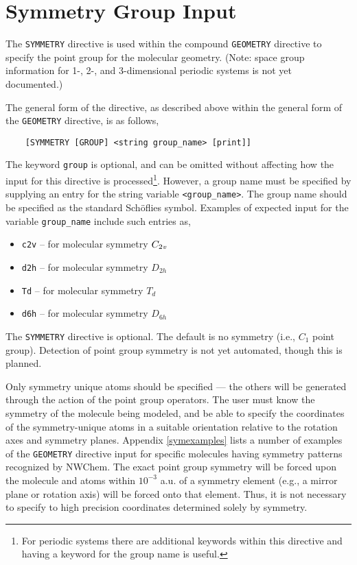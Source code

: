 \section{Symmetry Group Input}

The \verb+SYMMETRY+ directive is used within the compound \verb+GEOMETRY+
directive to specify the point group for the
molecular geometry. (Note: space group information for 1-, 2-, and
3-dimensional periodic systems is not yet documented.)

The general form of the directive, as described above within the general
form of the \verb+GEOMETRY+ directive, is as follows,
\begin{verbatim}
    [SYMMETRY [GROUP] <string group_name> [print]]
\end{verbatim}
The keyword \verb+group+ is optional, and can be omitted without affecting
how the input for this directive is processed\footnote{For periodic
  systems there are additional keywords within this directive and having
  a keyword for the group name is useful.}.
However, a group name must be specified by supplying an entry for the
string variable \verb+<group_name>+.  The
group name should be specified as the standard Sch\"{o}flies symbol.
Examples of expected input for the variable \verb+group_name+ include
such entries as,

\begin{itemize}
\item \verb+c2v+ -- for molecular symmetry $C_{2{\it v}}$
\item \verb+d2h+ -- for molecular symmetry $D_{2h}$
\item \verb+Td+ -- for molecular symmetry $T_d$
\item \verb+d6h+ -- for molecular symmetry $D_{6h}$
\end{itemize}

The \verb+SYMMETRY+ directive is optional.  The default is no symmetry 
(i.e., $C_1$ point group). Detection of point
group symmetry is not yet automated, though this is planned.  

Only symmetry unique atoms should be specified --- the others will be
generated through the action of the point group operators.  The user
must know the symmetry of the molecule being modeled, and be able to
specify the coordinates of the symmetry-unique atoms in a suitable
orientation relative to the rotation axes and symmetry planes.
Appendix \ref{symexamples} lists a number of examples of the
\verb+GEOMETRY+ directive input for specific molecules having symmetry
patterns recognized by NWChem.  The exact point group symmetry will be
forced upon the molecule and atoms within $10^{-3}$ a.u. of a symmetry
element (e.g., a mirror plane or rotation axis) will be forced onto
that element.  Thus, it is not necessary to specify to high precision
coordinates determined solely by symmetry.

